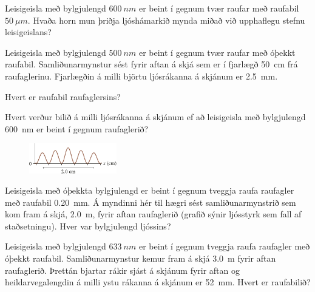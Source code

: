 \ifdefined \wholebook \else\documentclass[oneside]{book}\usepackage{EdlBook}\graphicspath{{figures/}}
\begin{document}
\begin{enumerate}[label = \textbf{(\alph*)}]

\item[\textbf{(33.2)}] Leisigeisla með bylgjulengd $\SI{600}{nm}$ er beint í gegnum tvær raufar með raufabil $\SI{50}{\mu m}$. Hvaða horn mun þriðja ljóshámarkið mynda miðað við upphaflegu stefnu leisigeislans?

\item[\textbf{(33.3)}] Leisigeisla með bylgjulengd $\SI{500}{nm}$ er beint í gegnum tvær raufar með óþekkt raufabil. Samliðunarmynstur sést fyrir aftan á skjá sem er í fjarlægð \SI{50}{cm} frá raufaglerinu. Fjarlægðin á milli björtu ljósrákanna á skjánum er \SI{2.5}{mm}. \begin{enumerate*}[label = \textbf{(\alph*)}]
    \item Hvert er raufabil raufaglersins?
    \item Hvert verður bilið á milli ljósrákanna á skjánum ef að leisigeisla með bylgjulengd \SI{600}{nm} er beint í gegnum raufaglerið?
\end{enumerate*}

\begin{minipage}{\linewidth}
\begin{figure}
\vspace{-0.5cm}
\includegraphics[width = 1.5in]{figures/rk3336.pdf}
\end{figure}

\item[\textbf{(33.37)}] Leisigeisla með óþekkta bylgjulengd er beint í gegnum tveggja raufa raufagler með raufabil \SI{0.20}{mm}. Á myndinni hér til hægri sést samliðunarmynstrið sem kom fram á skjá, \SI{2.0}{m}, fyrir aftan raufaglerið (grafið sýnir ljósstyrk sem fall af staðsetningu). Hver var bylgjulengd ljóssins?

\end{minipage}

\item[\textbf{(33.35)}] Leisigeisla með bylgjulengd $\SI{633}{nm}$ er beint í gegnum tveggja raufa raufagler með óþekkt raufabil. Samliðunarmynstur kemur fram á skjá \SI{3.0}{m} fyrir aftan raufaglerið. Þrettán bjartar rákir sjást á skjánum fyrir aftan og heildarvegalengdin á milli ystu rákanna á skjánum er \SI{52}{mm}. Hvert er raufabilið?



\end{enumerate}
\end{document}
